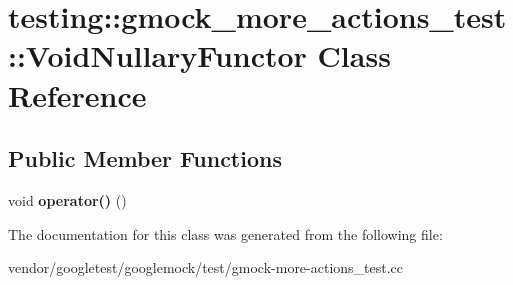 \hypertarget{classtesting_1_1gmock__more__actions__test_1_1_void_nullary_functor}{}\section{testing\+:\+:gmock\+\_\+more\+\_\+actions\+\_\+test\+:\+:Void\+Nullary\+Functor Class Reference}
\label{classtesting_1_1gmock__more__actions__test_1_1_void_nullary_functor}
\subsection*{Public Member Functions}
\begin{DoxyCompactItemize}
\item 
\mbox{\label{classtesting_1_1gmock__more__actions__test_1_1_void_nullary_functor_a3b71273472780abc47927c57af209204}} 
void {\bfseries operator()} ()
\end{DoxyCompactItemize}


The documentation for this class was generated from the following file\+:\begin{DoxyCompactItemize}
\item 
vendor/googletest/googlemock/test/gmock-\/more-\/actions\+\_\+test.\+cc\end{DoxyCompactItemize}

